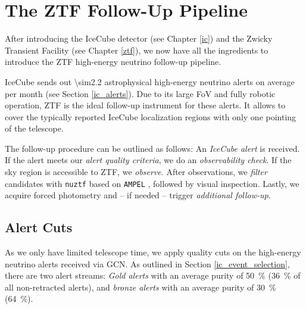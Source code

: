\documentclass[
    a4paper, %
    fontsize=10pt, %
    twoside=true, %
    numbers=noenddot, %
    fontmethod=tex,
]{kaobook}
\begin{document}

\tableofcontents
\listoffigures

\let\cleardoublepage\bigskip
\let\clearpage\bigskip

\listoftables

\endgroup

\mainmatter
{}







\chapter{The ZTF Follow-Up Pipeline} \label{fupipeline}
After introducing the IceCube detector (see Chapter \ref{ic}) and the Zwicky Transient Facility (see Chapter \ref{ztf}), we now have all the ingredients to introduce the ZTF high-energy neutrino follow-up pipeline.

IceCube sends out \num{\sim2.2} astrophysical high-energy neutrino alerts on average per month (see Section \ref{ic_alerts}). Due to its large FoV and fully robotic operation, ZTF is the ideal follow-up instrument for these alerts. It allows to cover the typically reported IceCube localization regions with only one pointing of the telescope.

The follow-up procedure can be outlined as follows: An \textit{IceCube alert} is received. If the alert meets our \textit{alert quality criteria}, we do an \textit{observability check}. If the sky region is accessible to ZTF, we \textit{observe}. After observations, we \textit{filter} candidates with \texttt{nuztf} based on \texttt{AMPEL} , followed by visual inspection. Lastly, we acquire forced photometry and -- if needed -- trigger \textit{additional follow-up}.

\section{Alert Cuts}\label{alert_cuts}
As we only have limited telescope time, we apply quality cuts on the high-energy neutrino alerts received via GCN. As outlined in Section \ref{ic_event_selection}, there are two alert streams: \textit{Gold alerts} with an average purity of \SI{50}{\percent} (\SI{36}{\percent} of all non-retracted alerts), and \textit{bronze alerts} with an average purity of \SI{30}{\percent} (\SI{64}{\percent}).
\end{document}
